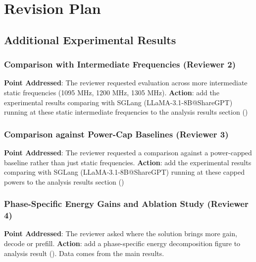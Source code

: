 \section{Revision Plan}

\subsection{Additional Experimental Results}


\subsubsection{Comparison with Intermediate Frequencies (Reviewer 2)}

\textbf{Point Addressed}: The reviewer requested evaluation across more intermediate static frequencies (1095 MHz, 1200 MHz, 1305 MHz).
\textbf{Action}: add the experimental results comparing \name with SGLang (LLaMA-3.1-8B@ShareGPT) running at these static intermediate frequencies to the analysis results section ()

\subsubsection{Comparison against Power-Cap Baselines (Reviewer 3)}

\textbf{Point Addressed}: The reviewer requested a comparison against a power-capped baseline rather than just static frequencies.
\textbf{Action}: add the experimental results comparing \name with SGLang (LLaMA-3.1-8B@ShareGPT) running at these capped powers to the analysis results section ()

\subsubsection{Phase-Specific Energy Gains and Ablation Study (Reviewer 4)}

\textbf{Point Addressed}: The reviewer asked where the solution brings more gain, decode or prefill.
\textbf{Action}: add a phase-specific energy decomposition figure to analysis result (). Data comes from the main results.

 

